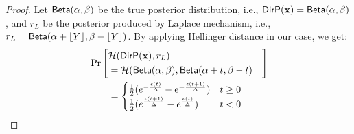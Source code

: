 \documentclass{article}
\begin{document}
\begin{proof}
Let $\mathsf{Beta}(\alpha, \beta)$ be the true posterior distribution, i.e., $\mathsf{DirP}(\textbf{x}) = \mathsf{Beta}(\alpha, \beta)$, and $r_L$ be the posterior produced by Laplace mechanism, i.e., $r_L = \mathsf{Beta}(\alpha + \lfloor Y \rfloor, \beta - \lfloor Y \rfloor)$. By applying Hellinger distance in our case, we get:
\begin{align*}
&
\Pr\left[
\begin{aligned}
\lefteqn{\hellinger(\bysinfer{\dataobs}, r_L )}\\ 
&= \hellinger(\betad(\alpha, \beta), \betad(\alpha + t, \beta - t)
\end{aligned}
\right]
\\
&\qquad = 
\begin{cases}
\frac{1}{2} (e^{- \frac{\epsilon (t)}{\Delta }} - e^{- \frac{\epsilon (t + 1)}{\Delta }}) &  t \geq 0\\
\frac{1}{2} (e^{\frac{\epsilon (t + 1)}{\Delta }} - e^{\frac{\epsilon (t)}{\Delta }}) & t < 0
\end{cases}
\end{align*}


\end{proof}
\end{document}
